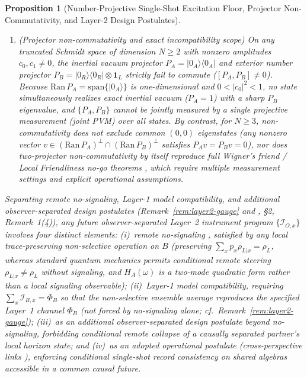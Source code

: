 \documentclass[11pt,a4paper]{article}
\newtheorem{proposition}{Proposition}
\theoremstyle{definition}
\theoremstyle{remark}
\newcommand{\cI}{\mathcal{I}}
\newcommand{\1}{\mathbf{1}}
\begin{document}
\begin{proposition}[Number-Projective Single-Shot Excitation Floor, Projector Non-Commutativity, and Layer-2 Design Postulates]
\begin{enumerate}
  \item[(b)] \emph{(Projector non-commutativity and exact incompatibility scope)} On any truncated Schmidt space of dimension $N\ge 2$ with nonzero amplitudes $c_0, c_1\neq 0$, the inertial vacuum projector $P_A=|0_A\rangle\langle 0_A|$ and exterior number projector $P_B=|0_R\rangle\langle 0_R|\otimes\1_L$ strictly fail to commute ($[P_A,P_B]\neq 0$). Because $\mathrm{Ran}\,P_A = \mathrm{span}\{|0_A\rangle\}$ is one-dimensional and $0<|c_0|^2<1$, no state simultaneously realizes exact inertial vacuum ($P_A=1$) with a sharp $P_B$ eigenvalue, and $\{P_A,P_B\}$ cannot be jointly measured by a single projective measurement (joint PVM) over all states. By contrast, for $N\ge 3$, non-commutativity does \emph{not} exclude common $(0,0)$ eigenstates (any nonzero vector $v\in(\mathrm{Ran}\,P_A)^\perp\cap(\mathrm{Ran}\,P_B)^\perp$ satisfies $P_A v=P_B v=0$), nor does two-projector non-commutativity by itself reproduce full Wigner's friend / Local Friendliness no-go theorems \cite{FrauchigerRenner2018,Bong2020,HausmannRenner2025}, which require multiple measurement settings and explicit operational assumptions.
\end{enumerate}
Separating remote no-signaling, Layer-1 model compatibility, and additional observer-separated design postulates (Remark~\ref{rem:layer2-gauge} and \cite{Soga2026OSTQD}, \S2, Remark~1(4)), any future observer-separated Layer~2 instrument program $\{\cI_{O,x}\}$ involves four distinct elements: (i)~\emph{remote no-signaling} \cite{Gisin1990}, satisfied by any local trace-preserving non-selective operation on $B$ (preserving $\sum_x p_x \rho_{L|x}=\rho_L$, whereas standard quantum mechanics permits conditional remote steering $\rho_{L|x}\neq\rho_L$ \cite{WisemanJonesDoherty2007} without signaling, and $H_A(\omega)$ is a two-mode quadratic form rather than a local signaling observable); (ii)~\emph{Layer-1 model compatibility}, requiring $\sum_x\cI_{B,x}=\Phi_B$ so that the non-selective ensemble average reproduces the specified Layer~1 channel $\Phi_B$ (not forced by no-signaling alone; cf.\ Remark~\ref{rem:layer2-gauge}); (iii)~as an \emph{additional observer-separated design postulate} beyond no-signaling, forbidding conditional remote collapse of a causally separated partner's local horizon state; and (iv)~as an \emph{adopted operational postulate} (cross-perspective links \cite{AdlamRovelli2022}), enforcing conditional single-shot record consistency on shared algebras accessible in a common causal future.
\end{proposition}
\end{document}
